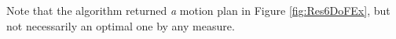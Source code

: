 Note that the algorithm returned \textit{a} motion plan in Figure \ref{fig:Res6DoFEx}, but not necessarily an optimal one by any measure.


%
%
%



